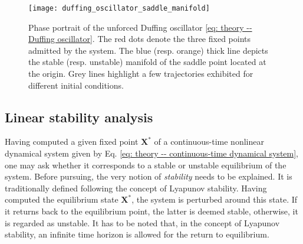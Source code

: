   \begin{figure}[b]
    \centering
    \sidecaption
    \texttt{[image: duffing\_oscillator\_saddle\_manifold]}
    \caption{Phase portrait of the unforced Duffing oscillator \eqref{eq: theory -- Duffing oscillator}. The red dots denote the three fixed points admitted by the system. The blue (resp. orange) thick line depicts the stable (resp. unstable) manifold of the saddle point located at the origin. Grey lines highlight a few trajectories exhibited for different initial conditions.}
    \label{fig: theory -- Duffing oscillator}
  \end{figure}


  \subsection{Linear stability analysis}
  \label{subsec: theory -- linear stability}

  Having computed a given fixed point $\mathbf{X}^*$ of a continuous-time nonlinear dynamical system given by Eq. \eqref{eq: theory -- continuous-time dynamical system}, one may ask whether it corresponds to a stable or unstable equilibrium of the system. Before pursuing, the very notion of \emph{stability} needs to be explained. It is traditionally defined following the concept of Lyapunov stability. Having computed the equilibrium state $\mathbf{X}^*$, the system is perturbed around this state. If it returns back to the equilibrium point, the latter is deemed stable, otherwise, it is regarded as unstable. It has to be noted that, in the concept of Lyapunov stability, an infinite time horizon is allowed for the return to equilibrium.

